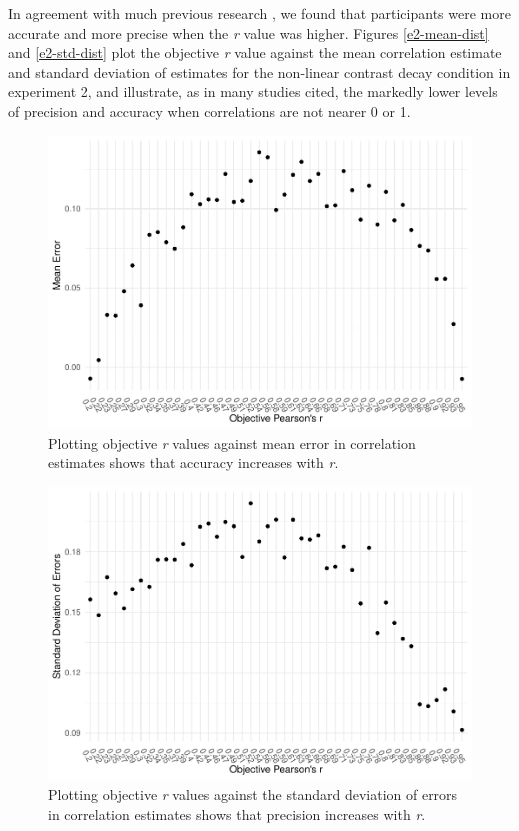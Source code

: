 \documentclass[preprint, 3p,
authoryear]{elsarticle} %
\begin{document}
In agreement with much previous research
\citep{rensink_2010, rensink_2012, rensink_2014, rensink_2017, pollack_1960},
we found that participants were more accurate and more precise when the
\emph{r} value was higher. Figures \ref{e2-mean-dist} and
\ref{e2-std-dist} plot the objective \emph{r} value against the mean
correlation estimate and standard deviation of estimates for the
non-linear contrast decay condition in experiment 2, and illustrate, as
in many studies cited, the markedly lower levels of precision and
accuracy when correlations are not nearer 0 or 1.

\begin{figure}

\includegraphics[width=0.5\linewidth]{contrast_and_scatterplots_files/figure-latex/e2-mean-dist-1} \hfill{}

\caption{\label{e2-mean-dist}Plotting objective \textit{r} values against mean error in correlation estimates shows that accuracy increases with \textit{r}.}\label{fig:e2-mean-dist}
\end{figure}

\begin{figure}

\includegraphics[width=0.5\linewidth]{contrast_and_scatterplots_files/figure-latex/e2-std-dist-1} \hfill{}

\caption{\label{e2-std-dist}Plotting objective \textit{r} values against the standard deviation of errors in correlation estimates shows that precision increases with \textit{r}.}\label{fig:e2-std-dist}
\end{figure}
\end{document}
